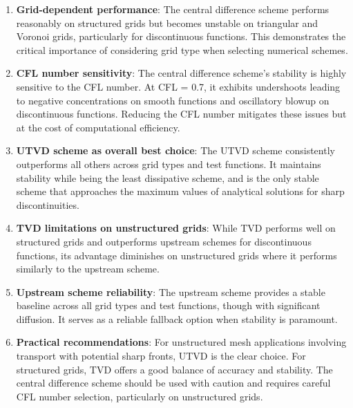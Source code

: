 \begin{enumerate}
\item \textbf{Grid-dependent performance}: The central difference scheme performs reasonably on structured grids but becomes unstable on triangular and Voronoi grids, particularly for discontinuous functions. This demonstrates the critical importance of considering grid type when selecting numerical schemes.

\item \textbf{CFL number sensitivity}: The central difference scheme's stability is highly sensitive to the CFL number. At CFL = 0.7, it exhibits undershoots leading to negative concentrations on smooth functions and oscillatory blowup on discontinuous functions. Reducing the CFL number mitigates these issues but at the cost of computational efficiency.

\item \textbf{UTVD scheme as overall best choice}: The UTVD scheme consistently outperforms all others across grid types and test functions. It maintains stability while being the least dissipative scheme, and is the only stable scheme that approaches the maximum values of analytical solutions for sharp discontinuities.

\item \textbf{TVD limitations on unstructured grids}: While TVD performs well on structured grids and outperforms upstream schemes for discontinuous functions, its advantage diminishes on unstructured grids where it performs similarly to the upstream scheme.

\item \textbf{Upstream scheme reliability}: The upstream scheme provides a stable baseline across all grid types and test functions, though with significant diffusion. It serves as a reliable fallback option when stability is paramount.

\item \textbf{Practical recommendations}: For unstructured mesh applications involving transport with potential sharp fronts, UTVD is the clear choice. For structured grids, TVD offers a good balance of accuracy and stability. The central difference scheme should be used with caution and requires careful CFL number selection, particularly on unstructured grids.
\end{enumerate}                 
